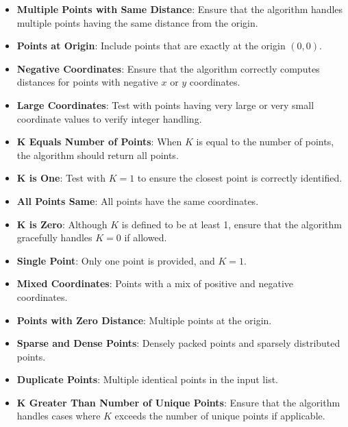 \begin{itemize}
    \item \textbf{Multiple Points with Same Distance}: Ensure that the algorithm handles multiple points having the same distance from the origin.
    
    \item \textbf{Points at Origin}: Include points that are exactly at the origin \((0,0)\).
    
    \item \textbf{Negative Coordinates}: Ensure that the algorithm correctly computes distances for points with negative \(x\) or \(y\) coordinates.
    
    \item \textbf{Large Coordinates}: Test with points having very large or very small coordinate values to verify integer handling.
    
    \item \textbf{K Equals Number of Points}: When \(K\) is equal to the number of points, the algorithm should return all points.
    
    \item \textbf{K is One}: Test with \(K = 1\) to ensure the closest point is correctly identified.
    
    \item \textbf{All Points Same}: All points have the same coordinates.
    
    \item \textbf{K is Zero}: Although \(K\) is defined to be at least 1, ensure that the algorithm gracefully handles \(K = 0\) if allowed.
    
    \item \textbf{Single Point}: Only one point is provided, and \(K = 1\).
    
    \item \textbf{Mixed Coordinates}: Points with a mix of positive and negative coordinates.
    
    \item \textbf{Points with Zero Distance}: Multiple points at the origin.
    
    \item \textbf{Sparse and Dense Points}: Densely packed points and sparsely distributed points.
    
    \item \textbf{Duplicate Points}: Multiple identical points in the input list.
    
    \item \textbf{K Greater Than Number of Unique Points}: Ensure that the algorithm handles cases where \(K\) exceeds the number of unique points if applicable.
\end{itemize}


